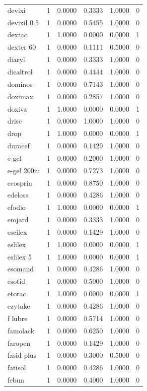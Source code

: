 \begin{longtable}{p{3.0cm}rrrrr}
devixi & 1 & 0.0000 & 0.3333 & 1.0000 & 0 \\
devixil 0.5 & 1 & 0.0000 & 0.5455 & 1.0000 & 0 \\
dextac & 1 & 1.0000 & 0.0000 & 0.0000 & 1 \\
dexter 60 & 1 & 0.0000 & 0.1111 & 0.5000 & 0 \\
diaryl & 1 & 0.0000 & 0.3333 & 1.0000 & 0 \\
dicaltrol & 1 & 0.0000 & 0.4444 & 1.0000 & 0 \\
dominos & 1 & 0.0000 & 0.7143 & 1.0000 & 0 \\
doximax & 1 & 0.0000 & 0.2857 & 1.0000 & 0 \\
doxiva & 1 & 1.0000 & 0.0000 & 0.0000 & 1 \\
drise & 1 & 0.0000 & 1.0000 & 1.0000 & 0 \\
drop & 1 & 1.0000 & 0.0000 & 0.0000 & 1 \\
duracef & 1 & 0.0000 & 0.1429 & 1.0000 & 0 \\
e-gel & 1 & 0.0000 & 0.2000 & 1.0000 & 0 \\
e-gel 200iu & 1 & 0.0000 & 0.7273 & 1.0000 & 0 \\
ecosprin & 1 & 0.0000 & 0.8750 & 1.0000 & 0 \\
edeloss & 1 & 0.0000 & 0.4286 & 1.0000 & 0 \\
efodio & 1 & 1.0000 & 0.0000 & 0.0000 & 1 \\
emjard & 1 & 0.0000 & 0.3333 & 1.0000 & 0 \\
escilex & 1 & 0.0000 & 0.1429 & 1.0000 & 0 \\
eslilex & 1 & 1.0000 & 0.0000 & 0.0000 & 1 \\
eslilex 5 & 1 & 1.0000 & 0.0000 & 0.0000 & 1 \\
esomand & 1 & 0.0000 & 0.4286 & 1.0000 & 0 \\
esotid & 1 & 0.0000 & 0.5000 & 1.0000 & 0 \\
etorac & 1 & 1.0000 & 0.0000 & 0.0000 & 1 \\
ezytake & 1 & 0.0000 & 0.4286 & 1.0000 & 0 \\
f lubre & 1 & 0.0000 & 0.5714 & 1.0000 & 0 \\
famolack & 1 & 0.0000 & 0.6250 & 1.0000 & 0 \\
faropen & 1 & 0.0000 & 0.1429 & 1.0000 & 0 \\
fasid plus & 1 & 0.0000 & 0.3000 & 0.5000 & 0 \\
fatisol & 1 & 0.0000 & 0.4286 & 1.0000 & 0 \\
febun & 1 & 0.0000 & 0.4000 & 1.0000 & 0 \\

\end{longtable}
